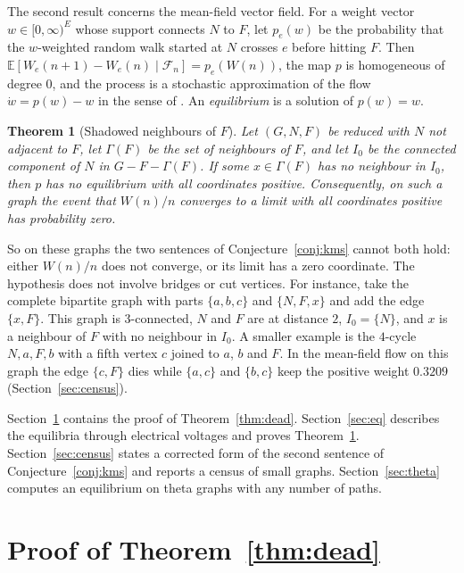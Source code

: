 \documentclass[11pt]{amsart}
\newtheorem{theorem}{Theorem}
\theoremstyle{remark}
\newcommand{\EE}{\mathbb{E}}
\newcommand{\cF}{\mathcal{F}}
\begin{document}
The second result concerns the mean-field vector field. For a weight vector $w\in[0,\infty)^E$ whose support connects
$N$ to $F$, let $p_e(w)$ be the probability that the $w$-weighted random walk started at $N$ crosses $e$ before
hitting $F$. Then $\EE[W_e(n+1)-W_e(n)\mid\cF_n]=p_e(W(n))$, the map $p$ is homogeneous of degree $0$, and the process
is a stochastic approximation of the flow $\dot w=p(w)-w$ in the sense of \cite{Ben,Pem90}. An \emph{equilibrium} is a solution of $p(w)=w$.

\begin{theorem}[Shadowed neighbours of $F$]\label{thm:shadow}
Let $(G,N,F)$ be reduced with $N$ not adjacent to $F$, let $\Gamma(F)$ be the set of neighbours of $F$, and let $I_0$ be
the connected component of $N$ in $G-F-\Gamma(F)$. If some $x\in \Gamma(F)$ has no neighbour in $I_0$, then $p$ has no
equilibrium with all coordinates positive. Consequently, on such a graph the event that $W(n)/n$ converges to a limit
with all coordinates positive has probability zero.
\end{theorem}

So on these graphs the two sentences of Conjecture~\ref{conj:kms} cannot both hold: either $W(n)/n$ does not converge,
or its limit has a zero coordinate. The hypothesis does not involve bridges or cut vertices. For instance, take
the complete bipartite graph with parts $\{a,b,c\}$ and $\{N,F,x\}$ and add the edge $\{x,F\}$. This graph is
$3$-connected, $N$ and $F$ are at distance $2$, $I_0=\{N\}$, and $x$ is a neighbour of $F$ with no neighbour in $I_0$.
A smaller example is the $4$-cycle $N,a,F,b$ with a fifth vertex $c$ joined to $a$, $b$ and $F$. In the mean-field
flow on this graph the edge $\{c,F\}$ dies while $\{a,c\}$ and $\{b,c\}$ keep the positive weight $0.3209$
(Section~\ref{sec:census}).

Section~\ref{sec:proof} contains the proof of Theorem~\ref{thm:dead}. Section~\ref{sec:eq} describes the equilibria
through electrical voltages and proves Theorem~\ref{thm:shadow}. Section~\ref{sec:census} states a corrected form of
the second sentence of Conjecture~\ref{conj:kms} and reports a census of small graphs. Section~\ref{sec:theta}
computes an equilibrium on theta graphs with any number of paths.

\section{Proof of Theorem~\ref{thm:dead}}\label{sec:proof}
\end{document}
